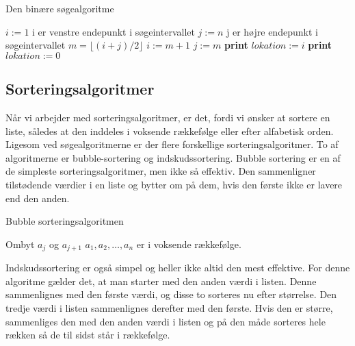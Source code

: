\begin{algorithm}[H]
\caption{Den binære søgealgoritme}
\begin{algorithmic}[1]

    \State $i:=1$ {i er venstre endepunkt i søgeintervallet}
    \State $j:=n$ {j er højre endepunkt i søgeintervallet}
        \State $m=\lfloor (i+j)/2 \rfloor$
    		\State $i:=m+1$
    		\Else
    		\State $j:=m$
    		\EndIf
    \State \textbf{print} $lokation:=i$
    \Else
    \State \textbf{print} $lokation:=0$
    \EndIf
    \EndWhile  \label{roy's loop}
\EndProcedure

\end{algorithmic}
\end{algorithm}

\subsection{Sorteringsalgoritmer}
Når vi arbejder med sorteringsalgoritmer, er det, fordi vi ønsker at sortere en liste, således at den inddeles i voksende rækkefølge eller efter alfabetisk orden. Ligesom ved søgealgoritmerne er der flere forskellige sorteringsalgoritmer. To af algoritmerne er bubble-sortering og indskudssortering. Bubble sortering er en af de simpleste sorteringsalgoritmer, men ikke så effektiv. Den sammenligner tilstødende værdier i en liste og bytter om på dem, hvis den første ikke er lavere end den anden.

\begin{algorithm}[H]
\caption{Bubble sorteringsalgoritmen}
\begin{algorithmic}[1]

\EndProcedure
{}
    			\State Ombyt $a_{j}$ og $a_{j+1}$ 	
\EndIf
\EndFor
\EndFor
\State $a_{1},a_{2},\dotsc,a_{n}$ er i voksende rækkefølge. 

\end{algorithmic}
\end{algorithm}

Indskudssortering er også simpel og heller ikke altid den mest effektive. For denne algoritme gælder det, at man starter med den anden værdi i listen. Denne sammenlignes med den første værdi, og disse to sorteres nu efter størrelse. Den tredje værdi i listen sammenlignes derefter med den første. Hvis den er større, sammenliges den med den anden værdi i listen og på den måde sorteres hele rækken så de til sidst står i rækkefølge.

